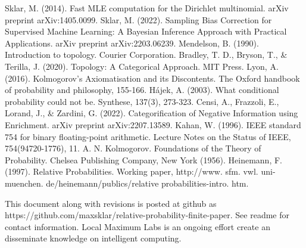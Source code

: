 \documentclass[twoside]{article}
\theoremstyle{plain}%
\theoremstyle{definition}
\theoremstyle{remark}
\begin{document}
\begin{thebibliography}{20}

Sklar, M. (2014). Fast MLE computation for the Dirichlet multinomial. arXiv preprint arXiv:1405.0099.
Sklar, M. (2022). Sampling Bias Correction for Supervised Machine Learning: A Bayesian Inference Approach with Practical Applications. arXiv preprint arXiv:2203.06239.
Mendelson, B. (1990). Introduction to topology. Courier Corporation.
Bradley, T. D., Bryson, T., \& Terilla, J. (2020). Topology: A Categorical Approach. MIT Press.
Lyon, A. (2016). Kolmogorov’s Axiomatisation and its Discontents. The Oxford handbook of probability and philosophy, 155-166.
Hájek, A. (2003). What conditional probability could not be. Synthese, 137(3), 273-323.
Censi, A., Frazzoli, E., Lorand, J., \& Zardini, G. (2022). Categorification of Negative Information using Enrichment. arXiv preprint arXiv:2207.13589.
Kahan, W. (1996). IEEE standard 754 for binary floating-point arithmetic. Lecture Notes on the Status of IEEE, 754(94720-1776), 11.
A. N. Kolmogorov. Foundations of the Theory of Probability. Chelsea Publishing Company, New York
(1956). 
Heinemann, F. (1997). Relative Probabilities. Working paper, http://www. sfm. vwl. uni-muenchen. de/heinemann/publics/relative probabilities-intro. htm.

\end{thebibliography}

This document along with revisions is posted at github as https://github.com/maxsklar/relative-probability-finite-paper. See readme for contact information. Local Maximum Labs is an ongoing effort create an disseminate knowledge on intelligent computing.
\end{document}
